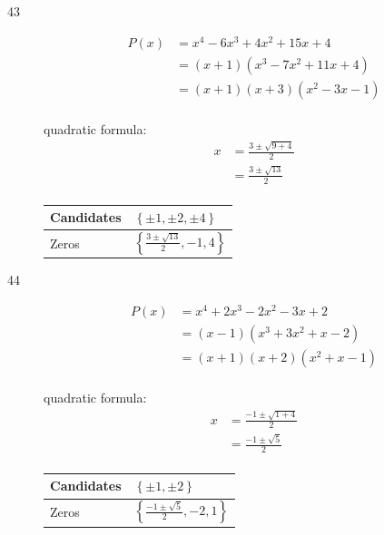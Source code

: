 \documentclass{exam}
\begin{document}
\begin{description}
      \item[43] 
        \begin{align*}
          P(x) &= x^4 - 6x^3 + 4x^2 + 15x + 4 \\
               &= (x + 1)(x^3 - 7x^2 + 11x + 4) \\
               &= (x + 1)(x + 3)(x^2 - 3x - 1) \\
        \end{align*}
        
        quadratic formula:
        \begin{align*}
          x &= \frac{3 \pm \sqrt{9 + 4}}{2} \\
            &= \frac{3 \pm \sqrt{13}}{2} \\
        \end{align*}

        \begin{tabular}{ll}
          \toprule
          Candidates & $\left\{ \pm 1, \pm 2, \pm 4 \right\}$ \\
          \midrule
          Zeros      & $\left\{ \frac{3 \pm \sqrt{13}}{2}, -1, 4 \right\}$ \\
          \bottomrule
        \end{tabular}

        \vspace{.5 cm}

      \item[44] 
        \begin{align*}
          P(x) &= x^4 + 2x^3 - 2x^2 - 3x + 2 \\
               &= (x - 1)(x^3 + 3x^2 + x - 2) \\
               &= (x + 1)(x + 2)(x^2 + x - 1) \\
        \end{align*}
        
        quadratic formula:
        \begin{align*}
          x &= \frac{-1 \pm \sqrt{1 + 4}}{2} \\
            &= \frac{-1 \pm \sqrt{5}}{2} \\
        \end{align*}

        \begin{tabular}{ll}
          \toprule
          Candidates & $\left\{ \pm 1, \pm 2 \right\}$ \\
          \midrule
          Zeros      & $\left\{ \frac{-1 \pm \sqrt{5}}{2}, -2, 1 \right\}$ \\
          \bottomrule
        \end{tabular}


\end{description}
\end{document}
